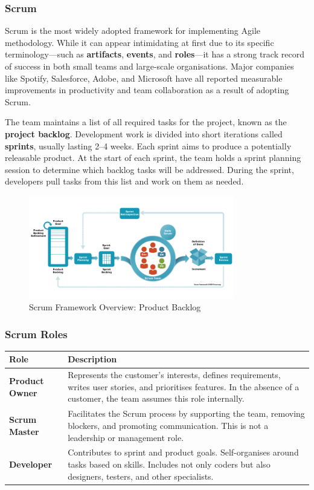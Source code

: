 \documentclass{article}
\begin{document}
\subsubsection{Scrum}

Scrum is the most widely adopted framework for implementing Agile methodology. While it can appear intimidating at first due to its specific terminology—such as \textbf{artifacts}, \textbf{events}, and \textbf{roles}—it has a strong track record of success in both small teams and large-scale organisations. Major companies like Spotify, Salesforce, Adobe, and Microsoft have all reported measurable improvements in productivity and team collaboration as a result of adopting Scrum.

The team maintains a list of all required tasks for the project, known as the \textbf{project backlog}. Development work is divided into short iterations called \textbf{sprints}, usually lasting 2–4 weeks. Each sprint aims to produce a potentially releasable product. At the start of each sprint, the team holds a sprint planning session to determine which backlog tasks will be addressed. During the sprint, developers pull tasks from this list and work on them as needed.


\begin{figure}[h]
    \centering
    \includegraphics[width=0.8\textwidth]{scrum.png}
    \caption{Scrum Framework Overview: Product Backlog}
    \label{fig:scrum}
\end{figure}

\subsubsection*{Scrum Roles}
\begin{center}
\begin{tabularx}{\textwidth}{>{\bfseries}l X}
\toprule
Role & Description \\
\midrule
Product Owner & 
Represents the customer’s interests, defines requirements, writes user stories, and prioritises features. In the absence of a customer, the team assumes this role internally. \\
\addlinespace
Scrum Master & 
Facilitates the Scrum process by supporting the team, removing blockers, and promoting communication. This is not a leadership or management role. \\
\addlinespace
Developer & 
Contributes to sprint and product goals. Self-organises around tasks based on skills. Includes not only coders but also designers, testers, and other specialists. \\

\bottomrule
\end{tabularx}
\end{center}
\end{document}
